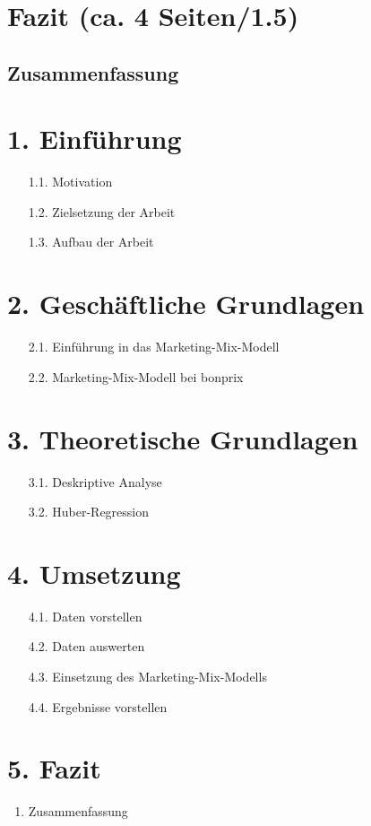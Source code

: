 \newpage
\section{Fazit (ca. 4 Seiten/1.5)}
\subsection{Zusammenfassung}

\section*{\normalsize 1. Einführung}
\begin{enumerate}
    \item[1.1.] Motivation
    \item[1.2.] Zielsetzung der Arbeit
    \item[1.3.] Aufbau der Arbeit
\end{enumerate}

\section*{\normalsize 2. Geschäftliche Grundlagen}
\begin{enumerate}
    \item[2.1.] Einführung in das Marketing-Mix-Modell
    \item[2.2.] Marketing-Mix-Modell bei bonprix
\end{enumerate}

\section*{\normalsize 3. Theoretische Grundlagen}
\begin{enumerate}
    \item[3.1.] Deskriptive Analyse
    \item[3.2.] Huber-Regression 
\end{enumerate}

\section*{\normalsize 4. Umsetzung}
\begin{enumerate}
    \item[4.1.] Daten vorstellen
    \item[4.2.] Daten auswerten
    \item[4.3.] Einsetzung des Marketing-Mix-Modells 
    \item[4.4.] Ergebnisse vorstellen
\end{enumerate}

\section*{\normalsize 5. Fazit}
\begin{enumerate}
    \item Zusammenfassung 
\end{enumerate}
